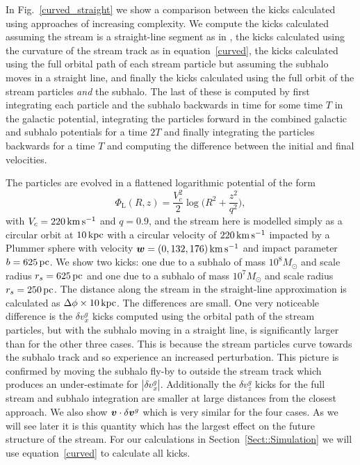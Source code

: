 \documentclass[useAMS,usenatbib,fleqn,a4paper]{mn2e}
\def\kpc{\,{\rm kpc}}
\def\pc{\,{\rm pc}}
\def\kms{\,{\rm km\,s^{-1}}}
\newcommand{\bs}[1]{\bmath{#1}}
\begin{document}
In Fig.~\ref{curved_straight} we show a comparison between the kicks calculated using approaches of increasing complexity. We compute the kicks calculated assuming the stream is a straight-line segment as in \cite{ErkalBelokurov2015}, the kicks calculated using the curvature of the stream track as in equation~\eqref{curved}, the kicks calculated using the full orbital path of each stream particle but assuming the subhalo moves in a straight line, and finally the kicks calculated using the full orbit of the stream particles \emph{and} the subhalo. The last of these is computed by first integrating each particle and the subhalo backwards in time for some time $T$ in the galactic potential, integrating the particles forward in the combined galactic and subhalo potentials for a time $2T$ and finally integrating the particles backwards for a time $T$ and computing the difference between the initial and final velocities.

The particles are evolved in a flattened logarithmic potential of the form
\begin{equation}
\Phi_\mathrm{L}(R,z) = \frac{V_c^2}{2}\log\Big(R^2+\frac{z^2}{q^2}\Big),
\label{potential}
\end{equation}
with $V_c = 220\kms$ and $q = 0.9$, and the stream here is modelled simply as a circular orbit at $10\kpc$ with a circular velocity of $220\kms$ impacted by a Plummer sphere with velocity $\bs{w}=(0,132,176)\kms$ and impact parameter $b=625\pc$. We show two kicks: one due to a subhalo of mass $10^8M_\odot$ and scale radius $r_s=625\pc$ and one due to a subhalo of mass $10^7M_\odot$ and scale radius $r_s=250\pc$. The distance along the stream in the straight-line approximation is calculated as $\Delta\phi\times10\kpc$. The differences are small. One very noticeable difference is the $\delta v^g_x$ kicks computed using the orbital path of the stream particles, but with the subhalo moving in a straight line, is significantly larger than for the other three cases. This is because the stream particles curve towards the subhalo track and so experience an increased perturbation. This picture is confirmed by moving the subhalo fly-by to outside the stream track which produces an under-estimate for $|\delta v^g_x|$. Additionally the $\delta v^g_z$ kicks for the full stream and subhalo integration are smaller at large distances from the closest approach. We also show $\bs{v}\cdot\delta\bs{v}^g$ which is very similar for the four cases. As we will see later it is this quantity which has the largest effect on the future structure of the stream. For our calculations in Section~\ref{Sect::Simulation} we will use equation~\eqref{curved} to calculate all kicks.
\end{document}
